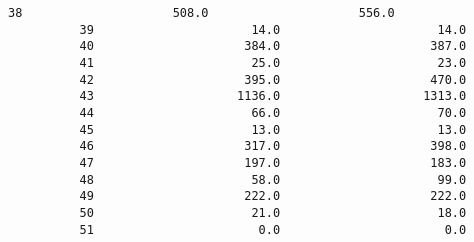 \documentclass[11pt]{article}
\begin{document}
\begin{Verbatim}[commandchars=\\\{\}]
          38                     508.0                     556.0   
          39                      14.0                      14.0   
          40                     384.0                     387.0   
          41                      25.0                      23.0   
          42                     395.0                     470.0   
          43                    1136.0                    1313.0   
          44                      66.0                      70.0   
          45                      13.0                      13.0   
          46                     317.0                     398.0   
          47                     197.0                     183.0   
          48                      58.0                      99.0   
          49                     222.0                     222.0   
          50                      21.0                      18.0   
          51                       0.0                       0.0   
          

\end{Verbatim}
\end{document}
